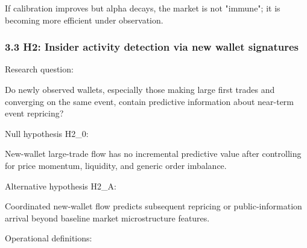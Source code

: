 \documentclass[
]{article}
\begin{document}
If calibration improves but alpha decays, the market is not "immune"; it
is becoming more efficient under observation.

\subsubsection{3.3 H2: Insider activity detection via new wallet
signatures}\label{33-h2-insider-activity-detection-via-new-wallet-signatures}

Research question:

Do newly observed wallets, especially those making large first trades
and converging on the same event, contain predictive information about
near-term event repricing?

Null hypothesis H2\_0:

New-wallet large-trade flow has no incremental predictive value after
controlling for price momentum, liquidity, and generic order imbalance.

Alternative hypothesis H2\_A:

Coordinated new-wallet flow predicts subsequent repricing or
public-information arrival beyond baseline market microstructure
features.

Operational definitions:
\end{document}
